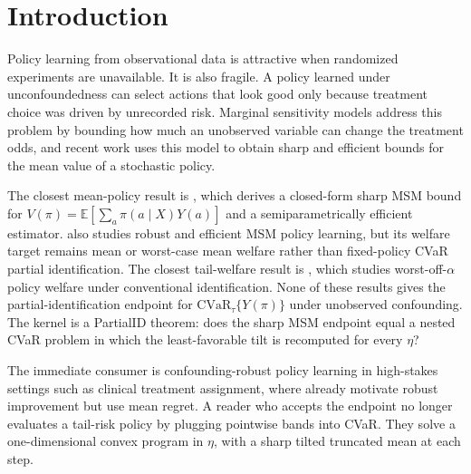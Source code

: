 \documentclass[11pt]{article}
\newcommand{\E}{\mathbb{E}}
\theoremstyle{definition}
\theoremstyle{plain}
\theoremstyle{remark}
\begin{document}
\section{Introduction}
Policy learning from observational data is attractive when randomized experiments are unavailable.  It is also fragile.  A policy learned under unconfoundedness can select actions that look good only because treatment choice was driven by unrecorded risk.  Marginal sensitivity models address this problem by bounding how much an unobserved variable can change the treatment odds, and recent work uses this model to obtain sharp and efficient bounds for the mean value of a stochastic policy.

The closest mean-policy result is \citet[Secs.~3--4]{HessFrauenMelnychukFeuerriegel2025SharpOPE}, which derives a closed-form sharp MSM bound for \(V(\pi)=\E[\sum_a\pi(a\mid X)Y(a)]\) and a semiparametrically efficient estimator.  \citet{JinXuZhengZhou2025RobustEfficientPolicy} also studies robust and efficient MSM policy learning, but its welfare target remains mean or worst-case mean welfare rather than fixed-policy CVaR partial identification.  The closest tail-welfare result is \citet{FanQiXu2025AlphaExpectedWelfare}, which studies worst-off-\(\alpha\) policy welfare under conventional identification.  None of these results gives the partial-identification endpoint for \(\mathrm{CVaR}_{\tau}\{Y(\pi)\}\) under unobserved confounding.  The kernel is a PartialID theorem: does the sharp MSM endpoint equal a nested CVaR problem in which the least-favorable tilt is recomputed for every \(\eta\)?

The immediate consumer is confounding-robust policy learning in high-stakes settings such as clinical treatment assignment, where \citet{KallusZhou2018ConfoundingRobustPolicy} already motivate robust improvement but use mean regret.  A reader who accepts the endpoint no longer evaluates a tail-risk policy by plugging pointwise bands into CVaR.  They solve a one-dimensional convex program in \(\eta\), with a sharp tilted truncated mean at each step.
\end{document}
